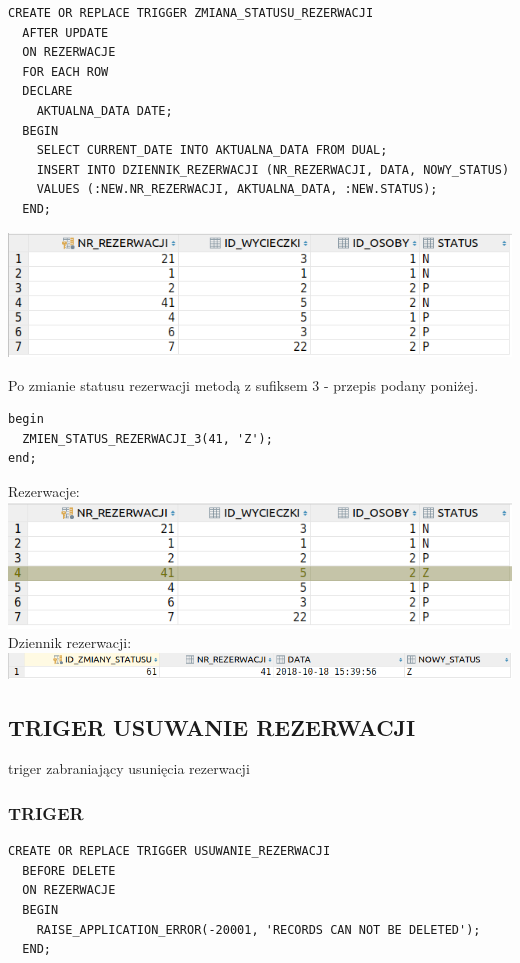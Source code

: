 \begin{verbatim}
CREATE OR REPLACE TRIGGER ZMIANA_STATUSU_REZERWACJI
  AFTER UPDATE
  ON REZERWACJE
  FOR EACH ROW
  DECLARE
    AKTUALNA_DATA DATE;
  BEGIN
    SELECT CURRENT_DATE INTO AKTUALNA_DATA FROM DUAL;
    INSERT INTO DZIENNIK_REZERWACJI (NR_REZERWACJI, DATA, NOWY_STATUS)
    VALUES (:NEW.NR_REZERWACJI, AKTUALNA_DATA, :NEW.STATUS);
  END;
\end{verbatim}

\includegraphics[width=\linewidth]{./images/zmien_status_rezerwacji_3.png}

Po zmianie statusu rezerwacji metodą z sufiksem 3 - przepis podany poniżej.
\begin{verbatim}
begin
  ZMIEN_STATUS_REZERWACJI_3(41, 'Z');
end;
\end{verbatim}

Rezerwacje:\\
\includegraphics[width=\linewidth]{./images/zmien_status_rezerwacji_3_.png}
Dziennik rezerwacji:\\
\includegraphics[width=\linewidth]{./images/zmien_status_rezerwacji_3___.png}

\subsection{TRIGER USUWANIE REZERWACJI}
triger zabraniający usunięcia rezerwacji

\subsubsection{TRIGER}
\begin{verbatim}
CREATE OR REPLACE TRIGGER USUWANIE_REZERWACJI
  BEFORE DELETE
  ON REZERWACJE
  BEGIN
    RAISE_APPLICATION_ERROR(-20001, 'RECORDS CAN NOT BE DELETED');
  END;
\end{verbatim}


